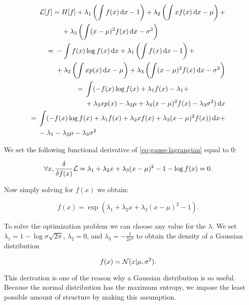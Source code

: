 \begin{align}
\begin{split}
\gL[f] ={}& H[f] + \lambda_1 \left( \int f(x) \dx - 1 \right) + \lambda_2 \left( \int x f(x) \dx - \mu \right) + \\
 &+ \lambda_3 \left( \int (x - \mu)^2 f(x) \dx - \sigma^2 \right)
\end{split} \\
%
\begin{split}
={}& -\int f(x) \log f(x) \dx  + \lambda_1 \left( \int f(x) \dx - 1 \right) + \\
&+ \lambda_2 \left( \int x p(x) \dx - \mu \right) + \lambda_3 \left( \int (x - \mu)^2  f(x) \dx - \sigma^2 \right)
\end{split} \\
%
\begin{split}
={}& \int ( - f(x) \log f(x) + \lambda_1 f(x) - \lambda_1 + \\
&+ \lambda_2 x p(x) - \lambda_2 \mu + \lambda_3 (x - \mu)^2  f(x) - \lambda_3 \sigma^2 ) \dx \\
\end{split} \\
%
\begin{split}
={}& \int ( - f(x)\log f(x) + \lambda_1 f(x) + \lambda_2 x f(x) + \lambda_3 (x - \mu)^2  f(x) ) \dx + \\
&- \lambda_1 - \lambda_2 \mu - \lambda_3 \sigma^2 \label{eq:gauss-lagrangian}
\end{split}
\end{align}

 We set the following functional derivative of \eqref{eq:gauss-lagrangian} equal to $0$:

\begin{equation}
\forall x, \frac{\delta}{\delta f(x)} {\mathcal{L}} = \lambda_1 + \lambda_2 x + \lambda_3 (x - \mu)^2 - 1 - \log f(x) = 0.
\end{equation}

Now simply solving for $f(x)$ we obtain:

\begin{equation}
f(x) = \exp \left( \lambda_1 + \lambda_2 x + \lambda_3 (x - \mu)^2 - 1 \right).
\end{equation}

To solve the optimization problem we can choose any value for the $\lambda$. We set $\lambda_1 = 1 - \log \sigma \sqrt{2 \pi}$, $\lambda_2 = 0$, and $\lambda_3 = - \frac{1}{2 \sigma^2}$ to obtain the density of a Gaussian distribution

\begin{equation}
f(x) = {\mathcal{N}}(x | \mu, \sigma^2).
\end{equation}

This derivation is one of the reason why a Gaussian distribution is so useful.  Because the normal distribution has the maximum entropy, we impose the least possible amount of structure by making this assumption.

